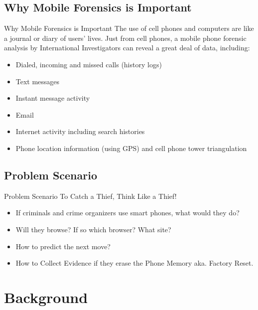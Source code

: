 \documentclass{beamer}
\begin{document}
\subsection{Why Mobile Forensics is Important}
\begin{frame}{Why Mobile Forensics is Important}
The use of cell phones and computers are like a journal or diary of users’ lives. Just from cell phones, a mobile phone forensic analysis by International Investigators can reveal a great deal of data, including:

\begin{itemize}
\item Dialed, incoming and missed calls (history logs)
\item Text messages
\item Instant message activity
\item Email
\item Internet activity including search histories
\item Phone location information (using GPS) and cell phone tower triangulation
\end{itemize}
\end{frame}
\subsection{Problem Scenario}
\begin{frame}{Problem Scenario}
To Catch a Thief, Think Like a Thief!
\begin{itemize}
\item If criminals and crime organizers use smart phones, what would they do?
\item Will they browse? If so which browser? What site?
\item How to predict the next move?
\item How to Collect Evidence if they erase the Phone Memory aka. Factory Reset.
\end{itemize}
\end{frame}

\section{Background}
\end{document}
